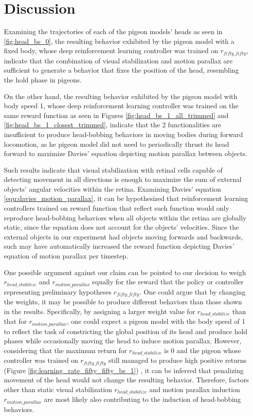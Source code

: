 \chapter{Discussion}
  Examining the trajectories of each of the pigeon models' heads as seen in \ref{fig:head_bs_0}, the resulting behavior exhibited by the pigeon model with a fixed body, whose deep reinforcement learning controller was trained on $r_{fifty\_fifty}$, indicate that the combination of visual stabilization and motion parallax are sufficient to generate a behavior that fixes the position of the head, resembling the hold phase in pigeons.

  On the other hand, the resulting behavior exhibited by the pigeon model with body speed 1, whose deep reinforcement learning controller was trained on the same reward function as seen in Figures \ref{fig:head_bs_1_all_trimmed} and \ref{fig:head_bs_1_closest_trimmed}, indicate that the 2 functionalities are insufficient to produce head-bobbing behaviors in moving bodies during forward locomotion, as he pigeon model did not need to periodically thrust its head forward to maximize Davies' equation depicting motion parallax between objects.

  Such results indicate that visual stabilization with retinal cells capable of detecting movement in all directions is enough to maximize the sum of external objects' angular velocities within the retina.
    Examining Davies' equation \ref{equ:davies_motion_parallax}, it can be hypothesized that reinforcement learning controllers trained on reward function that reflect such function would only reproduce head-bobbing behaviors when all objects within the retina are globally static, since the equation does not account for the objects' velocities.
    Since the external objects in our experiment had objects moving forwards and backwards, such may have automatically increased the reward function depicting Davies' equation of motion parallax per timestep.


  One possible argument against our claim can be pointed to our decision to weigh $r_{head\_stabilize}$ and $r_{motion\_parallax}$ equally for the reward that the policy or controller representing preliminary hypotheses $r_{fifty\_fifty}$. One could argue that by changing the weights, it may be possible to produce different behaviors than those shown in the results.
  Specifically, by assigning a larger weight value for $r_{head\_stabilize}$ than that for $r_{motion\_parallax}$, one could expect a pigeon model with the body speed of 1 to reflect the task of constricting the global position of its head and produce hold phases while occasionally moving the head to induce motion parallax.
  However, considering that the maximum return for $r_{head\_stabilize}$ is 0 and the pigeon whose controller was trained on $r_{fifty\_fifty}$ still managed to produce high positive returns (Figure \ref{fig:learning_rate_fifty_fifty_bs_1}) , it can be inferred that penalizing movement of the head would not change the resulting behavior.
  Therefore, factors other than static visual stabilization $r_{head\_stabilize}$ and motion parallax induction $r_{motion\_parallax}$ are most likely also contributing to the induction of head-bobbing behaviors.

